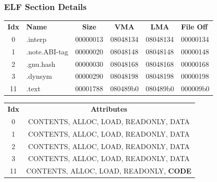 \begin{frame}[fragile]
\frametitle{ELF Section Details}

\begin{tabular}{clcccp{1cm}}
\textbf{Idx} & \textbf{Name}       & \textbf{Size}  & \textbf{VMA}     & \textbf{LMA}     & \textbf{File Off} \\
0            & .interp            & 00000013       & 08048134         & 08048134         & 00000134          \\
1            & .note.ABI-tag      & 00000020       & 08048148         & 08048148         & 00000148          \\
2            & .gnu.hash          & 00000030       & 08048168         & 08048168         & 00000168          \\
3            & .dynsym            & 00000290       & 08048198         & 08048198         & 00000198          \\
11           & .text              & 00001788       & 080489b0         & 080489b0         & 000009b0          \\

\end{tabular}

\vspace{1cm}

\begin{tabular}{cc}
\textbf{Idx} &  \textbf{Attributes}\\
0            &  CONTENTS, ALLOC, LOAD, READONLY, DATA \\
1            &  CONTENTS, ALLOC, LOAD, READONLY, DATA \\
2            &  CONTENTS, ALLOC, LOAD, READONLY, DATA \\
3            &  CONTENTS, ALLOC, LOAD, READONLY, DATA \\
11           &  CONTENTS, ALLOC, LOAD, READONLY, \textbf{CODE}
\end{tabular}

\end{frame}
